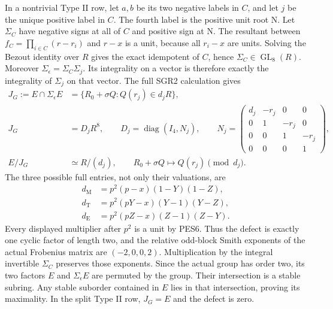 In a nontrivial Type II row, let $a,b$ be its two negative labels
in $C$, and let $j$ be the unique positive label in $C$.
The fourth label is the positive unit root $\mathrm N$.
Let $\Sigma_C$ have negative signs at all of $C$ and positive sign
at $\mathrm N$. The resultant between
$f_C=\prod_{i\in C}(r-r_i)$ and $r-x$ is a unit, because all
$r_i-x$ are units. Solving the Bezout identity over $R$ gives the
exact idempotent of $C$, hence $\Sigma_C\in\operatorname{GL}_8(R)$.
Moreover $\Sigma_\epsilon=\Sigma_C\Sigma_j$. Its integrality on a
vector is therefore exactly the integrality of $\Sigma_j$ on that
vector. The full SGR2 calculation gives
\[
\begin{aligned}
 J_G:=E\cap\Sigma_\epsilon E
   &=\{R_0+\sigma Q:Q(r_j)\in d_jR\},\\
 J_G&=D_jR^8,\qquad
 D_j=\operatorname{diag}(I_4,N_j),\qquad
 N_j=\begin{pmatrix}
 d_j&-r_j&0&0\\0&1&-r_j&0\\0&0&1&-r_j\\0&0&0&1
 \end{pmatrix},\\
 E/J_G&\simeq R/(d_j),\qquad
 R_0+\sigma Q\longmapsto Q(r_j)\pmod {d_j}.
\end{aligned}                                                   \tag{SLF12}
\]
The three possible full entries, not only their valuations, are
\[
\begin{aligned}
 d_{\mathrm M}&=p^2(p-x)(1-Y)(1-Z),\\
 d_{\mathrm T}&=p^2(pY-x)(Y-1)(Y-Z),\\
 d_{\mathrm E}&=p^2(pZ-x)(Z-1)(Z-Y).
\end{aligned}                                                   \tag{SLF13}
\]
Every displayed multiplier after $p^2$ is a unit by PES6.
Thus the defect is exactly one cyclic factor of length two,
and the relative odd-block Smith exponents of the actual Frobenius
matrix are $(-2,0,0,2)$. Multiplication by the integral invertible
$\Sigma_C$ preserves those exponents. Since the actual group has
order two, its two factors $E$ and $\Sigma_\epsilon E$ are permuted
by the group. Their intersection is a stable subring. Any stable
suborder contained in $E$ lies in that intersection, proving its
maximality. In the split Type II row, $J_G=E$ and the defect is zero.

